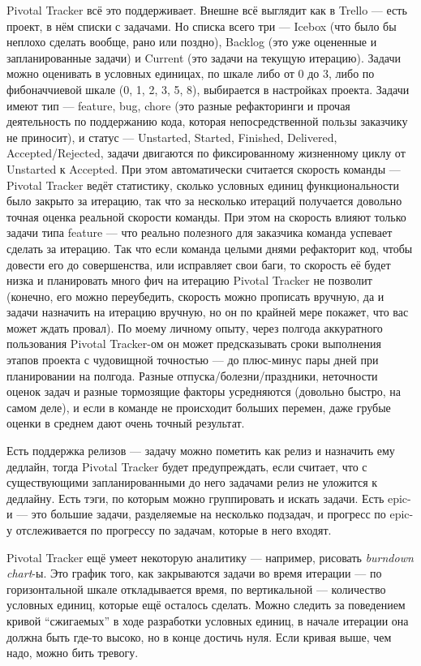 \documentclass[a5paper]{article}
\begin{document}
Pivotal Tracker всё это поддерживает. Внешне всё выглядит как в Trello --- есть проект, в нём списки с задачами. Но списка всего три --- Icebox (что было бы неплохо сделать вообще, рано или поздно), Backlog (это уже оцененные и запланированные задачи) и Current (это задачи на текущую итерацию). Задачи можно оценивать в условных единицах, по шкале либо от 0 до 3, либо по фибоначчиевой шкале (0, 1, 2, 3, 5, 8), выбирается в настройках проекта. Задачи имеют тип --- feature, bug, chore (это разные рефакторинги и прочая деятельность по поддержанию кода, которая непосредственной пользы заказчику не приносит), и статус --- Unstarted, Started, Finished, Delivered, Accepted/Rejected, задачи двигаются по фиксированному жизненному циклу от Unstarted к Accepted. При этом автоматически считается скорость команды --- Pivotal Tracker ведёт статистику, сколько условных единиц функциональности было закрыто за итерацию, так что за несколько итераций получается довольно точная оценка реальной скорости команды. При этом на скорость влияют только задачи типа feature --- что реально полезного для заказчика команда успевает сделать за итерацию. Так что если команда целыми днями рефакторит код, чтобы довести его до совершенства, или исправляет свои баги, то скорость её будет низка и планировать много фич на итерацию Pivotal Tracker не позволит (конечно, его можно переубедить, скорость можно прописать вручную, да и задачи назначить на итерацию вручную, но он по крайней мере покажет, что вас может ждать провал). По моему личному опыту, через полгода аккуратного пользования Pivotal Tracker-ом он может предсказывать сроки выполнения этапов проекта с чудовищной точностью --- до плюс-минус пары дней при планировании на полгода. Разные отпуска/болезни/праздники, неточности оценок задач и разные тормозящие факторы усредняются (довольно быстро, на самом деле), и если в команде не происходит больших перемен, даже грубые оценки в среднем дают очень точный результат.

Есть поддержка релизов --- задачу можно пометить как релиз и назначить ему дедлайн, тогда Pivotal Tracker будет предупреждать, если считает, что с существующими запланированными до него задачами релиз не уложится к дедлайну. Есть тэги, по которым можно группировать и искать задачи. Есть epic-и --- это большие задачи, разделяемые на несколько подзадач, и прогресс по epic-у отслеживается по прогрессу по задачам, которые в него входят.

Pivotal Tracker ещё умеет некоторую аналитику --- например, рисовать \textit{burndown chart}-ы. Это график того, как закрываются задачи во время итерации --- по горизонтальной шкале откладывается время, по вертикальной --- количество условных единиц, которые ещё осталось сделать. Можно следить за поведением кривой ``сжигаемых'' в ходе разработки условных единиц, в начале итерации она должна быть где-то высоко, но в конце достичь нуля. Если кривая выше, чем надо, можно бить тревогу.
\end{document}
